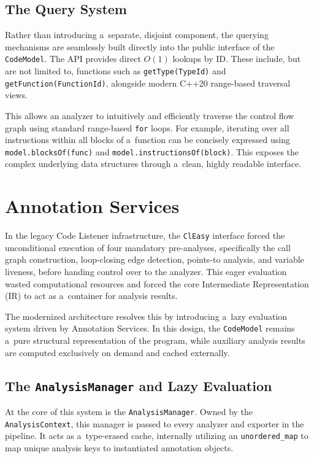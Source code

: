 \documentclass[xpsejal00-gcc-plugin.tex]{subfiles}
\begin{document}
\subsection*{The Query System}\label{sub:query-system}

Rather than introducing a~separate, disjoint  component, the querying mechanisms are seamlessly built directly into the public interface of the \texttt{CodeModel}.
The API provides direct $O(1)$ lookups by ID.\@
These include, but are not limited to, functions such as \texttt{getType(TypeId)} and \texttt{getFunction(FunctionId)}, alongside modern C++20 range-based traversal views.

This allows an analyzer to intuitively and efficiently traverse the control flow graph using standard range-based \texttt{for} loops.
For example, iterating over all instructions within all blocks of a~function can be concisely expressed using \texttt{model.blocksOf(func)} and \texttt{model.instructionsOf(block)}.
This exposes the complex underlying data structures through a~clean, highly readable interface.

\section{Annotation Services}\label{sec:annotation-services}

In the legacy Code Listener infrastructure, the \texttt{ClEasy} interface forced the unconditional execution of four mandatory pre-analyses, specifically the call graph construction, loop-closing edge detection, points-to analysis, and variable liveness, before handing control over to the analyzer.
This eager evaluation wasted computational resources and forced the core Intermediate Representation (IR) to act as a~container for analysis results.

The modernized architecture resolves this by introducing a~lazy evaluation system driven by Annotation Services.
In this design, the \texttt{CodeModel} remains a~pure structural representation of the program, while auxiliary analysis results are computed exclusively on demand and cached externally.

\subsection*{The \texttt{AnalysisManager} and Lazy Evaluation}\label{sub:analysis-manager}

At the core of this system is the \texttt{AnalysisManager}.
Owned by the \texttt{AnalysisContext}, this manager is passed to every analyzer and exporter in the pipeline.
It acts as a~type-erased cache, internally utilizing an \texttt{unordered\_map} to map unique analysis keys to instantiated annotation objects.
\end{document}
